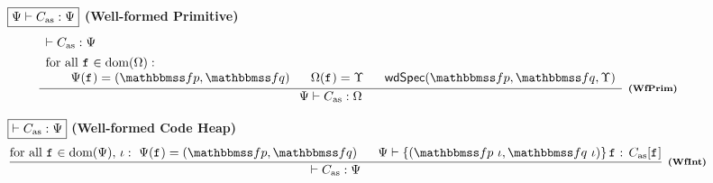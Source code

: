 \begin{figure*}[!t]
    \centering
    \subfigure
    {
        \begin{minipage}{1\linewidth}
            $\boxed{{\Psi} \vdash {C_{\text{as}}} : {\Psi}}$ \quad\quad
            \textbf{(Well-formed Primitive)}
            \[
				\infer[\tinybftext{(WfPrim)}]
				{
					\wfprim{\Cspec}{\asmimp}{\hprimset}
				}
				{
                    \begin{array}{l}
                        \wfcdhp{\asmimp}{\Cspec} \\
                        \\[-8pt]
                        \TYPE{for all } \lab{} \in \dom(\hprimset): \\
                        \qquad
                        \Cspec(\lab{}) = (\relspecpre, \relspecpost)
                        \quad \ \ 
                        \hprimset(\lab{}) = \hprim \quad \ \ 
                        \wdSpec{\relspecpre}{\relspecpost}
                        	{\hprim} 
                    \end{array}
				}
			\]
		\end{minipage}
    }

    \subfigure
    {
        \begin{minipage}{1\textwidth}
            $\boxed{\vdash {C_{\text{as}}} : {\Psi}}$ \qquad
            \textbf{(Well-formed Code Heap)}
            \[
                \infer[\tinybftext{(WfInt)}]
                {
                    \wfcdhp{\asmimp}{\Cspec}
                }
                {
                    \TYPE{for all } \lab{} \in \dom(\Cspec), \, 
                    \lgvl : \ 
                    \Cspec(\lab{}) = (\relspecpre, \relspecpost) 
                    \quad \ \ 
                    \wdcblk{\Cspec}{\relspecpre \ \lgvl}
                        {\relspecpost \ \lgvl}{\lab{}}
                        {\asmimp[\lab{}]}
                }
            \]
        \end{minipage}
    }


\end{figure*}
